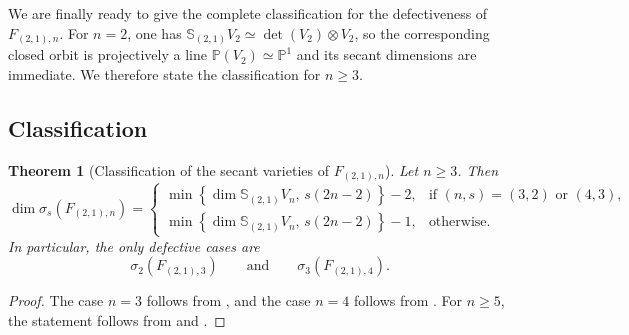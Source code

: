 \documentclass[a4paper,reqno]{amsart}
\theoremstyle{plainnopunct}
\newtheorem{theorem}{Theorem}[section]
\theoremstyle{definitionnopunct}
\renewcommand{\P}{\mathbb{P}}
\renewcommand{\S}{\mathbb{S}}
\begin{document}
We are finally ready to give the complete classification for the defectiveness of $F_{(2,1),n}$. For $n=2$, one has $\S_{(2,1)}V_2
\simeq
\det(V_2)\otimes V_2$,
so the corresponding closed orbit is projectively a line
$\P(V_2)\simeq\P^1$ and its secant dimensions are immediate. We
therefore state the classification for $n\geq3$.

\subsection{Classification}
\label{subsect: classification two step flags}

\begin{theorem}[Classification of the secant varieties of
$F_{(2,1),n}$]
\label{thm: classification two step flags}
Let $n\geq3$. Then
\[
\dim\sigma_s(F_{(2,1),n})
=
\begin{cases}
\min\left\{
\dim\S_{(2,1)}V_n,\,
s(2n-2)
\right\}-2,
&
\text{if }(n,s)=(3,2)\text{ or }(4,3),
\\[2mm]
\min\left\{
\dim\S_{(2,1)}V_n,\,
s(2n-2)
\right\}-1,
&
\text{otherwise}.
\end{cases}
\]
In particular, the only defective cases are
\[
\sigma_2(F_{(2,1),3})
\qquad\text{and}\qquad
\sigma_3(F_{(2,1),4}).
\]
\end{theorem}

\begin{proof}
The case $n=3$ follows from
\cite[Theorem~1.4]{BD10}, and the case $n=4$ follows from
. For $n\geq5$, the statement follows from
 and .
\end{proof}




\end{document}
